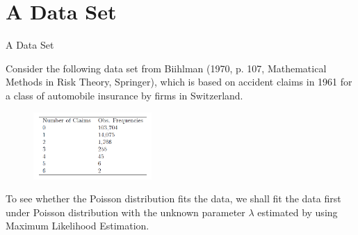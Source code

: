\documentclass{beamer}
\begin{document}
\section{A Data Set}
\begin{frame}{A Data Set}

    {\footnotesize \footnotesize
    \par  Consider the following data set from Biihlman (1970, p. 107, Mathematical Methods in Risk Theory, Springer), 
    which is based on accident claims in 1961 for a class of automobile insurance by firms in Switzerland.
    \begin{figure}
    \centering
    \includegraphics[width=0.4\textwidth]{2025-09-08 155257}
    \end{figure}
    \par  \pause To see whether the Poisson distribution fits the data, 
    we shall fit the data first under Poisson distribution with the 
    unknown parameter $\lambda$ estimated by using Maximum Likelihood Estimation.



    }
    
\end{frame}
\end{document}
